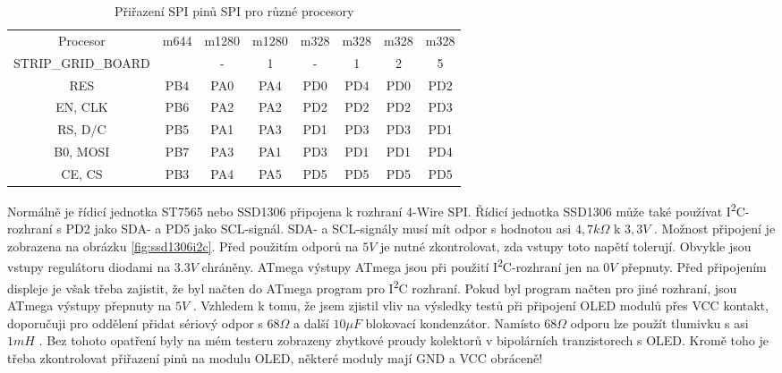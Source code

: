 \begin{table}[H]
  \begin{center}
    \begin{tabular}{| c || c | c | c | c | c | c | c |}
    \hline
 Procesor  & m644  & m1280 & m1280  & m328 & m328 & m328 & m328 \\
STRIP\_GRID\_BOARD &       &   -   &   1    &  -   &  1   &  2   &  5   \\
    \hline
    \hline
  RES       &  PB4  & PA0   &  PA4   & PD0  & PD4  & PD0  & PD2 \\
    \hline
  EN, CLK   &  PB6  & PA2   &  PA2   & PD2  & PD2  & PD2  & PD3 \\
    \hline
  RS, D/C   &  PB5  & PA1   &  PA3   & PD1  & PD3  & PD3  & PD1 \\
    \hline
  B0, MOSI  &  PB7  & PA3   &  PA1   & PD3  & PD1  & PD1  & PD4 \\
    \hline
  CE, CS    &  PB3  & PA4   &  PA5   & PD5  & PD5  & PD5  & PD5 \\
    \hline
    \end{tabular}
  \end{center}
  \caption{Přiřazení SPI pinů SPI pro různé procesory}
  \label{tab:spi-processor}
\end{table}

Normálně je řídicí jednotka ST7565 nebo SSD1306 připojena k rozhraní 4-Wire SPI.
Řídicí jednotka SSD1306 může také používat I\textsuperscript{2}C- rozhraní s PD2 jako SDA- a PD5 jako SCL-signál.
SDA- a SCL-signály musí mít  odpor s hodnotou asi \(4,7k\Omega\) k \(3,3V\) .
Možnost připojení je zobrazena na obrázku \ref{fig:ssd1306i2c}.
Před použitím  odporů na \(5V\) je nutné zkontrolovat, zda vstupy toto napětí tolerují.
Obvykle jsou vstupy regulátoru diodami na \(3.3V\) chráněny.
ATmega výstupy ATmega jsou při použití I\textsuperscript{2}C-rozhraní jen na  \(0V\) přepnuty.
Před připojením displeje je však třeba zajistit, že byl načten do ATmega program
pro I\textsuperscript{2}C rozhraní.
Pokud byl program načten pro jiné rozhraní, jsou ATmega výstupy přepnuty na \(5V\) .
Vzhledem k tomu, že jsem zjistil vliv na výsledky testů při připojení OLED modulů přes VCC kontakt,
doporučuji pro oddělení přidat sériový odpor s \(68\Omega\) a další \(10\mu F\) blokovací kondenzátor. 
Namísto \(68\Omega\) odporu lze použít tlumivku s asi \(1mH\) .
Bez tohoto opatření byly na mém testeru zobrazeny zbytkové proudy kolektorů v bipolárních tranzistorech s OLED.
Kromě toho je třeba zkontrolovat přiřazení pinů na modulu OLED, některé moduly mají GND a VCC obráceně!

